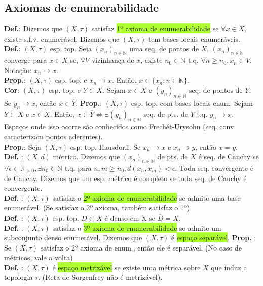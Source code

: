 \documentclass{article}
\begin{document}
\begin{landscape}
\begin{center}
\section{Axiomas de enumerabilidade}
\end{center}
\begin{multicols}{3}
\textbf{Def.}: Dizemos que $(X, \tau)$ satisfaz \colorbox{GreenYellow}{ 1º axioma de enumerabilidade} se $\forall x \in X$, existe s.f.v. enumerável. Dizemos que $(X,\tau)$ tem bases locais enumeráveis.\\
\textbf{Def.}: $(X, \tau)$ esp. top. Seja $(x_n)_{n \in \mathbb{N}}$ uma seq. de pontos de $X$. $(x_n)_{n \in \mathbb{N}}$ converge para $x \in X$ se, $\forall V$ vizinhança de $x$, existe $n_0 \in \mathbb{N}$ t.q. $\forall n \geq n_0, x_n \in V$. Notação: $x_n \rightarrow x$.\\
\textbf{Prop.}: $(X, \tau)$ esp. top. e $x_n \rightarrow x$. Então, $x \in \{x_n: n\in \mathbb{N}\}$.\\
\textbf{Cor}: $(X, \tau)$ esp. top. e $Y \subset X$. Sejam $x\in X$ e $(y_n)_{n \in \mathbb{N}}$ seq. de pontos de $Y$. Se $y_n \rightarrow x$, então $x \in \overline{Y}$.
\textbf{Prop.}: $(X, \tau)$ esp. top. com bases locais enum. Sejam $Y \subset X$ e $x \in X$. Então, $x \in \overline{Y} \iff \exists(y_n)_{n \in \mathbb{N}}$ seq. de pts. de $Y$ t.q. $y_n \rightarrow x$. Espaços onde isso ocorre são conhecidos como Frechét-Urysohn (seq. conv. caracterizam pontos aderentes).\\
\textbf{Prop.}: Seja $(X, \tau)$ esp. top. Hausdorff. Se $x_n \rightarrow x$ e $x_n \rightarrow y$, então $x = y$.\\
\textbf{Def. }: $(X, d)$ métrico. Dizemos que $(x_n)_{n\in \mathbb{N}}$ de pts. de $X$ é seq. de Cauchy se $\forall \epsilon \in \mathbb{R}_{>0},\exists n_0 \in \mathbb{N}$ t.q. para $n,m \geq n_0, d(x_n,x_m)<\epsilon$. Toda seq. convergente é de Cauchy. Dizemos que um esp. métrico é completo se toda seq. de Cauchy é convergente.\\
\textbf{Def. }: $(X, \tau)$ satisfaz o \colorbox{GreenYellow}{2º axioma de enumerabilidade} se admite uma base enumerável. (Se satisfaz o 2º axioma, também satisfaz o 1º)\\
\textbf{Def. }: $(X, \tau)$ esp. top. $D \subset X$ é denso em X se $\overline{D} = X$.\\
\textbf{Def. }: $(X, \tau)$ satisfaz o \colorbox{GreenYellow}{3º axioma de enumerabilidade} se admite um subconjunto denso enumerável. Dizemos que $(X, \tau)$ é \colorbox{GreenYellow}{espaço separável}.
\textbf{Prop. }: Se $(X, \tau)$ satisfaz o 2º axioma de enum., então ele é separável. (No caso de métricos, vale a volta)\\
\textbf{Def. }: $(X, \tau)$ é \colorbox{GreenYellow}{espaço metrizável} se existe uma métrica sobre $X$ que induz a topologia $\tau$. (Reta de Sorgenfrey não é metrizável).
\end{multicols}
\begin{center}


\end{center}
\end{landscape}
\end{document}
